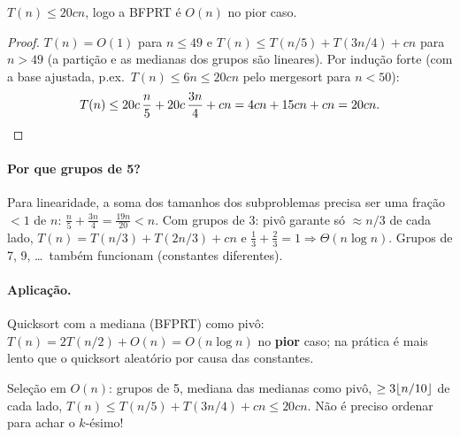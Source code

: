 \begin{teo}
$T(n)\le 20cn$, logo a BFPRT é $O(n)$ no pior caso.
\end{teo}
\begin{proof}
$T(n)=O(1)$ para $n\le49$ e $T(n)\le T(n/5)+T(3n/4)+cn$ para $n>49$ (a partição e as medianas dos grupos são lineares). Por indução forte (com a base ajustada, p.ex.\ $T(n)\le6n\le20cn$ pelo mergesort para $n<50$):
\[
T(n)\le 20c\,\frac n5+20c\,\frac{3n}{4}+cn=4cn+15cn+cn=20cn.\qedhere
\]
\end{proof}
\paragraph{Por que grupos de 5?} Para linearidade, a soma dos tamanhos dos subproblemas precisa ser uma fração $<1$ de $n$: $\frac n5+\frac{3n}4=\frac{19n}{20}<n$. Com grupos de 3: pivô garante só $\approx n/3$ de cada lado, $T(n)=T(n/3)+T(2n/3)+cn$ e $\frac13+\frac23=1\Rightarrow\Theta(n\log n)$. Grupos de 7, 9, \dots\ também funcionam (constantes diferentes).

\paragraph{Aplicação.} Quicksort com a mediana (BFPRT) como pivô: $T(n)=2T(n/2)+O(n)=O(n\log n)$ no \textbf{pior} caso; na prática é mais lento que o quicksort aleatório por causa das constantes.

\begin{chave}
Seleção em $O(n)$: grupos de 5, mediana das medianas como pivô, $\ge3\lfloor n/10\rfloor$ de cada lado, $T(n)\le T(n/5)+T(3n/4)+cn\le20cn$. Não é preciso ordenar para achar o $k$-ésimo!
\end{chave}
